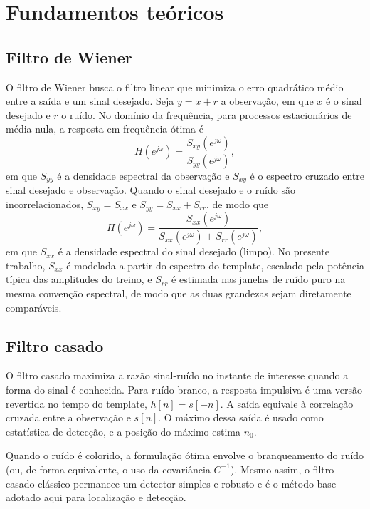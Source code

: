 \section{Fundamentos teóricos}

\subsection{Filtro de Wiener}

O filtro de Wiener busca o filtro linear que minimiza o erro quadrático médio
entre a saída e um sinal desejado. Seja \(y = x + r\) a observação, em que
\(x\) é o sinal desejado e \(r\) o ruído. No domínio da frequência, para
processos estacionários de média nula, a resposta em frequência ótima é
\begin{equation}
H(e^{j\omega}) = \frac{S_{xy}(e^{j\omega})}{S_{yy}(e^{j\omega})},
\end{equation}
em que \(S_{yy}\) é a densidade espectral da observação e \(S_{xy}\) é o
espectro cruzado entre sinal desejado e observação. Quando o sinal desejado e o
ruído são incorrelacionados, \(S_{xy} = S_{xx}\) e
\(S_{yy} = S_{xx} + S_{rr}\), de modo que
\begin{equation}
H(e^{j\omega}) = \frac{S_{xx}(e^{j\omega})}{S_{xx}(e^{j\omega}) + S_{rr}(e^{j\omega})},
\end{equation}
em que \(S_{xx}\) é a densidade espectral do sinal desejado (limpo). No
presente trabalho, \(S_{xx}\) é modelada a partir do espectro do template,
escalado pela potência típica das amplitudes do treino, e \(S_{rr}\) é
estimada nas janelas de ruído puro na mesma convenção espectral, de modo que
as duas grandezas sejam diretamente comparáveis.

\subsection{Filtro casado}

O filtro casado maximiza a razão sinal-ruído no instante de interesse quando a
forma do sinal é conhecida. Para ruído branco, a resposta impulsiva é uma
versão revertida no tempo do template, \(h[n] = s[-n]\). A saída equivale à
correlação cruzada entre a observação e \(s[n]\). O máximo dessa saída é usado
como estatística de detecção, e a posição do máximo estima \(n_0\).

Quando o ruído é colorido, a formulação ótima envolve o branqueamento do ruído
(ou, de forma equivalente, o uso da covariância \(C^{-1}\)). Mesmo assim, o
filtro casado clássico permanece um detector simples e robusto e é o método
base adotado aqui para localização e detecção.

